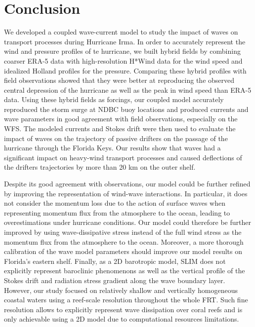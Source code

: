 \documentclass[preprint,12pt,authoryear]{elsarticle}
\begin{document}
\section{Conclusion}

We developed a coupled wave-current model to study the impact of waves on transport processes during Hurricane Irma. In order to accurately represent the wind and pressure profiles of te hurricane, we built hybrid fields by combining coarser ERA-5 data with high-resolution H*Wind data for the wind speed and idealized Holland profiles for the pressure. Comparing these hybrid profiles with field observations showed that they were better at reproducing the observed central depression of the hurricane as well as the peak in wind speed than ERA-5 data. Using these hybrid fields as forcings, our coupled model accurately reproduced the storm surge at NDBC buoy locations and produced currents and wave parameters in good agreement with field observations, especially on the WFS. The modeled currents and Stokes drift were then used to evaluate the impact of waves on the trajectory of passive drifters on the passage of the hurricane through the Florida Keys. Our results show that waves had a significant impact on heavy-wind transport processes and caused deflections of the drifters trajectories by more than 20 km on the outer shelf.

Despite its good agreement with observations, our model could be further refined by improving the representation of wind-wave interactions. In particular, it does not consider the momentum loss due to the action of surface waves when representing momentum flux from the atmosphere to the ocean, leading to overestimations under hurricane conditions. Our model could therefore be further improved by using wave-dissipative stress instead of the full wind stress as the momentum flux from the atmosphere to the ocean. Moreover, a more thorough calibration of the wave model parameters should improve our model results on Florida's eastern shelf. Finally, as a 2D barotropic model, SLIM does not explicitly represent baroclinic phenomenons as well as the vertical profile of the Stokes drift and radiation stress gradient along the wave boundary layer. However, our study focused on relatively shallow and vertically homogeneous coastal waters using a reef-scale resolution throughout the whole FRT. Such fine resolution allows to explicitly represent wave dissipation over coral reefs and is only achievable using a 2D model due to computational resources limitations.
\end{document}
